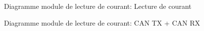		\begin{figure}[H]
			\centering
			\caption{Diagramme module de lecture de courant: Lecture de courant}
			\label{fig:diagrammefonctionnelcurrentlecture-de-courant}
		\end{figure}
				
		
		\begin{figure}[H]
			\centering
			\caption{Diagramme module de lecture de courant: CAN TX + CAN RX}
			\label{fig:diagrammefonctionnelcurrentcan}
		\end{figure}

\newpage